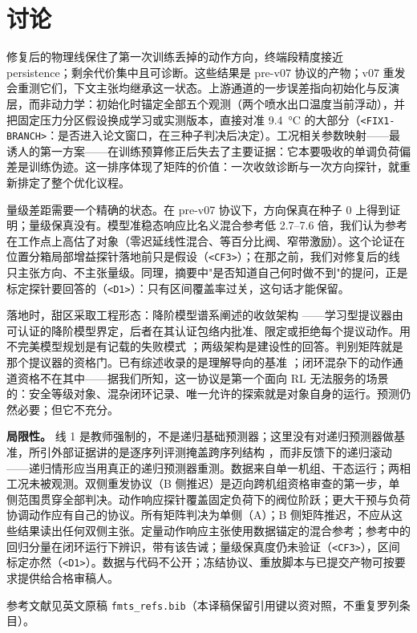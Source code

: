 \documentclass[11pt]{article}
\begin{document}
\section{讨论}

修复后的物理线保住了第一次训练丢掉的动作方向，终端段精度接近 persistence；剩余代价集中且可诊断。这些结果是 pre-v07 协议的产物；v07 重发会重测它们，下文主张均继承这一状态。上游通道的一步误差指向初始化与反演层，而非动力学：初始化时锚定全部五个观测（两个喷水出口温度当前浮动），并把固定压力分区假设换成学习或实测版本，直接对准 9.4~\si{\degreeCelsius} 的大部分（\texttt{\textless FIX1-BRANCH\textgreater}：是否进入论文窗口，在三种子判决后决定）。工况相关参数映射——最诱人的第一方案——在训练预算修正后失去了主要证据：它本要吸收的单调负荷偏差是训练伪迹。这一排序体现了矩阵的价值：一次收敛诊断与一次方向探针，就重新排定了整个优化议程。

量级差距需要一个精确的状态。在 pre-v07 协议下，方向保真在种子 0 上得到证明；量级保真没有。模型准稳态响应比名义混合参考低 2.7--7.6 倍，我们认为参考在工作点上高估了对象（零迟延线性混合、等百分比阀、窄带激励）。这个论证在位置分箱局部增益探针落地前只是假设（\texttt{\textless CF3\textgreater}）；在那之前，我们对修复后的线只主张方向、不主张量级。同理，摘要中"是否知道自己何时做不到"的提问，正是标定探针要回答的（\texttt{\textless D1\textgreater}）：只有区间覆盖率过关，这句话才能保留。

落地时，甜区采取工程形态：降阶模型谱系阐述的收敛架构 \cite{ghosh2026rom, benner2015survey, sha2001simplicity}——学习型提议器由可认证的降阶模型界定，后者在其认证包络内批准、限定或拒绝每个提议动作。用不完美模型规划是有记载的失败模式 \cite{jafferjee2021hallucinating, wang2022doublecheck}；两级架构是建设性的回答。判别矩阵就是那个提议器的资格门。已有综述收录的是理解导向的基准 \cite{ding2024understanding}；闭环混杂下的动作通道资格不在其中——据我们所知，这一协议是第一个面向 RL 无法服务的场景的：安全等级对象、混杂闭环记录、唯一允许的探索就是对象自身的运行。预测仍然必要；但它不充分。

\textbf{局限性。} 线 1 是教师强制的，不是递归基础预测器；这里没有对递归预测器做基准，所引外部证据讲的是逐序列评测掩盖跨序列结构 \cite{wan2026forecast}，而非反馈下的递归滚动——递归情形应当用真正的递归预测器重测。数据来自单一机组、干态运行；两相工况未被观测。双侧重发协议（B 侧推迟）是迈向跨机组资格审查的第一步，单侧范围贯穿全部判决。动作响应探针覆盖固定负荷下的阀位阶跃；更大干预与负荷协调动作应有自己的协议。所有矩阵判决为单侧（A）；B 侧矩阵推迟，不应从这些结果读出任何双侧主张。定量动作响应主张使用数据锚定的混合参考；参考中的回归分量在闭环运行下辨识，带有该告诫；量级保真度仍未验证（\texttt{\textless CF3\textgreater}），区间标定亦然（\texttt{\textless D1\textgreater}）。数据与代码不公开；冻结协议、重放脚本与已提交产物可按要求提供给合格审稿人。

\vspace{1em}
\noindent 参考文献见英文原稿 \texttt{fmts\_refs.bib}（本译稿保留引用键以资对照，不重复罗列条目）。
\end{document}
